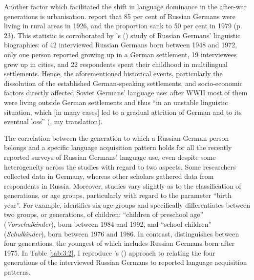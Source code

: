 Another factor which facilitated the shift in language dominance in the after-war generations is urbanisation. \citet{berend-riehl} report that 85 per cent of Russian Germans were living in rural areas in 1926, and the proportion sank to 50 per cent in 1979 (p. 23). This statistic is corroborated by \citeauthor{meng01}'s (\citeyear[83]{meng01}) study of Russian Germans' linguistic biographies: of 42 interviewed Russian Germans born between 1948 and 1972, only one person reported growing up in a German settlement, 19 interviewees grew up in cities, and 22 respondents spent their childhood in multilingual settlements. Hence, the aforementioned historical events, particularly the dissolution of the established German-speaking settlements, and socio-economic factors directly affected Soviet Germans' language use: after WWII most of them were living outside German settlements and thus ``in an unstable linguistic situation, which [in many cases] led to a gradual attrition of German and to its eventual loss'' (\citealt[20]{berend98}, my translation).

The correlation between the generation to which a Russian-German person belongs and a specific language acquisition pattern holds for all the recently reported surveys of Russian Germans' language use, even despite some heterogeneity across the studies with regard to two aspects. Some researchers \citep[e.g.,][]{berend98,meng01} collected data in Germany, whereas other scholars \citep[e.g.,][]{blankenhorn,riehlTA} gathered data from respondents in Russia. Moreover, studies vary slightly as to the classification of generations, or age groups, particularly with regard to the parameter “birth year”. For example, \citet{meng01} identifies six age groups and specifically differentiates between two groups, or generations, of children: ``children of preschool age'' (\textit{Vorschulkinder}), born between 1984 and 1992, and ``school children'' (\textit{Schulkinder}), born between 1976 and 1986. In contrast, \citet{riehlTA} distinguishes between four generations, the youngest of which includes Russian Germans born after 1975. In Table \ref{tab:3:2}, I reproduce \citeauthor{riehlTA}'s (\citeyear[]{riehlTA}) approach to relating the four generations of the interviewed Russian Germans to reported language acquisition patterns. 

